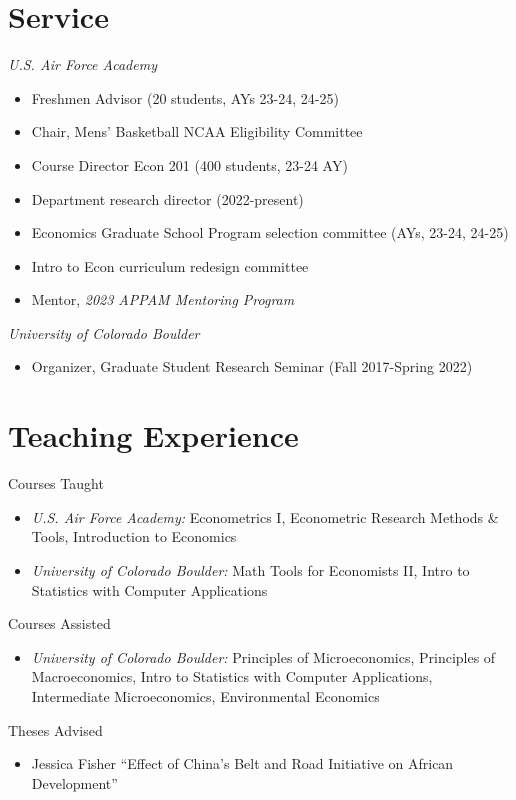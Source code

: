 \documentclass[letterpaper]{article}
\begin{document}
\section*{Service}
\textit{U.S. Air Force Academy}
  \begin{itemize}[topsep=2pt,itemsep=-1pt,leftmargin=1em]
    \item[] Freshmen Advisor (20 students, AYs 23-24, 24-25)
    \item[] Chair, Mens' Basketball NCAA Eligibility Committee
    \item[] Course Director Econ 201 (400 students, 23-24 AY)
    \item[] Department research director (2022-present)
    \item[] Economics Graduate School Program selection committee (AYs, 23-24, 24-25)
    \item[] Intro to Econ curriculum redesign committee
    \item[] Mentor, \textit{2023 APPAM Mentoring Program}
  \end{itemize}
  \vspace*{.5em}
\textit{University of Colorado Boulder}
  \begin{itemize}[topsep=2pt,itemsep=-1pt,leftmargin=1em]
    \item[] Organizer, Graduate Student Research Seminar (Fall 2017-Spring 2022)
  \end{itemize}

\section*{Teaching Experience}
  Courses Taught 
  \begin{itemize}[topsep=2pt,itemsep=-1pt,leftmargin=1em]
    \item[] \textit{U.S. Air Force Academy:} Econometrics I, Econometric Research Methods \& Tools, Introduction to Economics
    \item[] \textit{University of Colorado Boulder:} Math Tools for Economists II, Intro to Statistics with Computer Applications
  \end{itemize}
  \vspace*{.5em}
	Courses Assisted
	\begin{itemize}[topsep=2pt,itemsep=-1pt,leftmargin=1em]
    \item[] \textit{University of Colorado Boulder:} Principles of Microeconomics, Principles of Macroeconomics, Intro to Statistics with Computer Applications, Intermediate Microeconomics, Environmental Economics
  \end{itemize}
  Theses Advised
  \begin{itemize}[topsep=2pt,itemsep=-1pt,leftmargin=1em]
    \item[] Jessica Fisher ``Effect of China's Belt and Road Initiative on African Development'' 
  \end{itemize}
\end{document}
